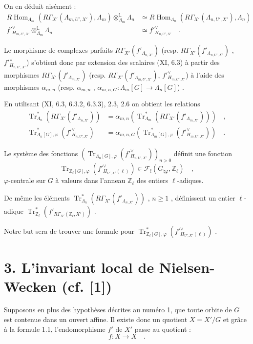 \documentclass[11pt]{article}
\DeclareMathOperator{\Hom}{Hom}
\providecommand{\Tr}{\operatorname{Tr}}
\providecommand{\Tr}{\operatorname{Tr}}
\providecommand{\Tr}{\operatorname{Tr}}
\providecommand{\Hom}{\operatorname{Hom}}
\providecommand{\Tr}{\operatorname{Tr}}
\providecommand{\La}{\Lambda}
\providecommand{\bZ}{\mathbb Z}
\providecommand{\Hom}{\operatorname{Hom}}
\providecommand{\Tr}{\operatorname{Tr}}
\begin{document}
On en déduit aisément :
\begin{align}
\tag{2.5} R\Hom_{\La_m}(R\Gamma_{X'}(\La_{m,U',X'}), \La_m) \otimes_{\La_m}^{\mathbb{L}} \La_n &\simeq R\Hom_{\La_n}(R\Gamma_{X'}(\La_{n,U',X'}), \La_n) \\
\tag{2.6} f'^\vee_{H_{m,U',X'}} \otimes_{\La_m}^{\mathbb{L}} \La_n &\simeq f'^\vee_{H_{n,U',X'}} \quad .
\end{align}

Le morphisme de complexes parfaits $R\Gamma_{X'}(f'_{\La_{n,X'}})$ (resp. $R\Gamma_{X'}(f'_{\La_{n,U',X'}})$ , $f'^\vee_{H_{n,U',X'}}$) s'obtient donc par extension des scalaires (XI, 6.3) à partir des morphismes $R\Gamma_{X'}(f'_{\La_{m,X'}})$ (resp. $R\Gamma_{X'}(f'_{\La_{m,U',X'}})$, $f'^\vee_{H_{m,U',X'}}$) à l'aide des morphismes $\alpha_{m,n}$ (resp. $\alpha_{m,n}$ , $\alpha_{m,n,G} : \La_m[G] \longrightarrow \La_n[G]$) .

En utilisant (XI, 6.3, 6.3.2, 6.3.3), 2.3, 2.6 on obtient les relations
\begin{align}
\tag{2.7} \Tr^*_{\La_n}(R\Gamma_{X'}(f'_{\La_{n,X'}})) &= \alpha_{m,n}(\Tr^*_{\La_m}(R\Gamma_{X'}(f'_{\La_{m,X'}}))) \quad , \\
\tag{2.8} \Tr^*_{\La_n[G],\varphi}(f'^\vee_{H_{n,U',X'}}) &= \alpha_{m,n,G}(\Tr^*_{\La_m[G],\varphi}(f'^\vee_{H_{m,U',X'}})) \quad .
\end{align}

Le système des fonctions $(\Tr_{\La_n[G],\varphi}(f'^\vee_{H_{n,U',X'}}))_{n>0}$ définit une fonction
\[
\Tr_{\bZ_\ell[G],\varphi}(f'^\vee_{H_{U',X'}(\ell)}) \in \mathcal{F}_!(G_{\natural\varphi}, \bZ_\ell) \quad ,
\]
$\varphi$-centrale sur $G$ à valeurs dans l'anneau $\bZ_\ell$ des entiers $\ell$-adiques.

De même les éléments $\Tr^*_{\La_n}(R\Gamma_{X'}(f'_{\La_{n,X'}}))$ , $n \geq 1$ , définissent un entier $\ell$-adique $\Tr^*_{\bZ_\ell}(f'_{R\Gamma_{X'}(\bZ_\ell,X')})$ .

Notre but sera de trouver une formule pour $\Tr^*_{\bZ_\ell[G],\varphi}(f'^\vee_{H_{U',X'}(\ell)})$ .


\section*{3. L'invariant local de Nielsen-Wecken (cf. [1])}
Supposons en plus des hypothèses décrites au numéro 1, que toute orbite de $G$ est contenue dans un ouvert affine. Il existe donc un quotient $X = X'/G$ et grâce à la formule 1.1, l'endomorphisme $f'$ de $X'$ passe au quotient :
\[
f : X \longrightarrow X \quad .
\]
\end{document}

